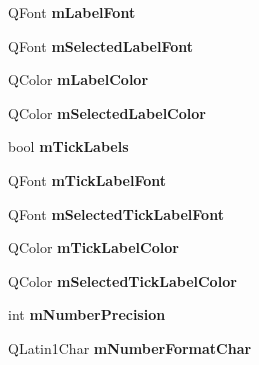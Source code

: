\begin{DoxyCompactItemize}
\item 
Q\+Font {\bfseries m\+Label\+Font}\hypertarget{class_q_c_p_axis_a37442d470e30e19b81ecaf979a34d046}{}\label{class_q_c_p_axis_a37442d470e30e19b81ecaf979a34d046}

\item 
Q\+Font {\bfseries m\+Selected\+Label\+Font}\hypertarget{class_q_c_p_axis_ae48fe3489afadc0b3cd003233e2bf19f}{}\label{class_q_c_p_axis_ae48fe3489afadc0b3cd003233e2bf19f}

\item 
Q\+Color {\bfseries m\+Label\+Color}\hypertarget{class_q_c_p_axis_a457a003bb1c2b6ab73e5a173ba7558fd}{}\label{class_q_c_p_axis_a457a003bb1c2b6ab73e5a173ba7558fd}

\item 
Q\+Color {\bfseries m\+Selected\+Label\+Color}\hypertarget{class_q_c_p_axis_a94f57de3ba024471ca206d83cf2258dd}{}\label{class_q_c_p_axis_a94f57de3ba024471ca206d83cf2258dd}

\item 
bool {\bfseries m\+Tick\+Labels}\hypertarget{class_q_c_p_axis_a3e4315be072026644e69009557a2fa11}{}\label{class_q_c_p_axis_a3e4315be072026644e69009557a2fa11}

\item 
Q\+Font {\bfseries m\+Tick\+Label\+Font}\hypertarget{class_q_c_p_axis_add79d1e39c4ed65869a1e9cc79043f3f}{}\label{class_q_c_p_axis_add79d1e39c4ed65869a1e9cc79043f3f}

\item 
Q\+Font {\bfseries m\+Selected\+Tick\+Label\+Font}\hypertarget{class_q_c_p_axis_a4f2e4919da9615dac612662c249b1119}{}\label{class_q_c_p_axis_a4f2e4919da9615dac612662c249b1119}

\item 
Q\+Color {\bfseries m\+Tick\+Label\+Color}\hypertarget{class_q_c_p_axis_a6384a749b3b56a97df081d8082321ab4}{}\label{class_q_c_p_axis_a6384a749b3b56a97df081d8082321ab4}

\item 
Q\+Color {\bfseries m\+Selected\+Tick\+Label\+Color}\hypertarget{class_q_c_p_axis_a3bcad40902f45dc4c991a2c3e4d31d70}{}\label{class_q_c_p_axis_a3bcad40902f45dc4c991a2c3e4d31d70}

\item 
int {\bfseries m\+Number\+Precision}\hypertarget{class_q_c_p_axis_acd76e8c783384d99ccc4a13797eec188}{}\label{class_q_c_p_axis_acd76e8c783384d99ccc4a13797eec188}

\item 
Q\+Latin1\+Char {\bfseries m\+Number\+Format\+Char}\hypertarget{class_q_c_p_axis_a39594313deef458f425bba25cd337a8a}{}\label{class_q_c_p_axis_a39594313deef458f425bba25cd337a8a}


\end{DoxyCompactItemize}

